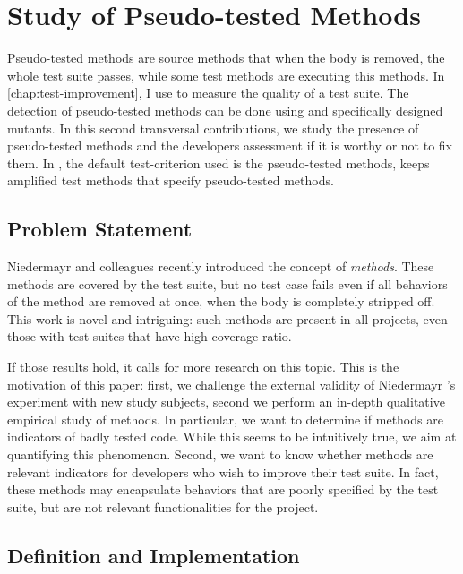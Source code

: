 \section{Study of Pseudo-tested Methods}
\label{sec:transversal-contributions:descartes}

Pseudo-tested methods are source methods that when the body is removed, the whole test suite passes, while some test methods are executing this methods.
In \autoref{chap:test-improvement}, I use \ms to measure the quality of a test suite.
The detection of pseudo-tested methods can be done using \ms and specifically designed mutants.
In this second transversal contributions, we study the presence of pseudo-tested methods and the developers assessment if it is worthy or not to fix them.
In \dspot, the default test-criterion used is the pseudo-tested methods, \ie \dspot keeps amplified test methods that specify pseudo-tested methods.

\subsection{Problem Statement}
\label{subsec:transversal-contributions:descartes:introduction}

Niedermayr and colleagues \cite{niedermayr_will_2016} recently introduced the concept of \emph{\pseudotested{} methods}. 
These methods are covered by the test suite, but no test case fails even if all behaviors of the method are removed at once, \ie when the body is completely stripped off.
This work is novel and intriguing:
such \pseudotested{} methods are present in all projects, even those with test suites that have high coverage ratio.

If those results hold, it calls for more research on this topic.
This is the motivation of this paper: 
first, we challenge the external validity of Niedermayr \etal's experiment with new study subjects, 
second we perform an in-depth qualitative empirical study of \pseudotested{} methods. 
In particular, we want to determine if \pseudotested{} methods are indicators of badly tested code. 
While this seems to be intuitively true, we aim at quantifying this phenomenon.
Second, we want to know whether \pseudotested{} methods are relevant indicators for developers who wish to improve their test suite. 
In fact, these methods may encapsulate behaviors that are poorly specified by the test suite, but are not relevant functionalities for the project.

\subsection{Definition and Implementation}
\label{subsec:transversal-contributions:descartes:definitions}

